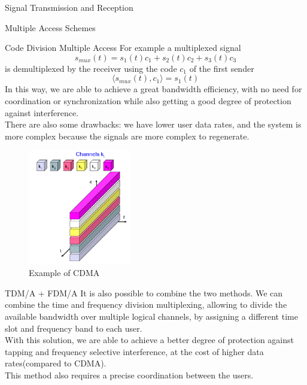\begin{section}{Signal Transmission and Reception}
\begin{subsection}{Multiple Access Schemes}
\begin{subsubsection}{Code Division Multiple Access}
      For example a multiplexed signal
      \begin{equation*}
        s_{mux}(t)=s_1(t)c_1+s_2(t)c_2+s_3(t)c_3
      \end{equation*}
      is demultiplexed by the receiver using the code $c_1$ of the first sender
      \begin{equation*}
        \langle s_{mux}(t),c_1\rangle=s_1(t)
      \end{equation*}
      In this way, we are able to achieve a great bandwidth efficiency, with no need for coordination
      or synchronization while also getting a good degree of protection against interference.\\
      There are also some drawbacks: we have lower user data rates, and the system is more complex
      because the signals are more complex to regenerate.\\
      \begin{figure}[h]
        \centering
        \includegraphics[width=0.4\textwidth]{img/wireless/CDMA.png}
        \caption{Example of CDMA}
        \label{fig:CDMA}
      \end{figure}
    \end{subsubsection}
    \begin{subsubsection}{TDM/A + FDM/A}
      It is also possible to combine the two methods.
      We can combine the time and frequency division multiplexing, allowing to divide the available
      bandwidth over multiple logical channels, by assigning a different time slot and frequency band
      to each user.\\
      With this solution, we are able to achieve a better degree of protection against tapping
      and frequency selective interference, at the cost of higher data rates(compared to CDMA).\\
      This method also requires a precise coordination between the users.\\
      \begin{figure}[h]

\end{figure}
\end{subsubsection}
\end{subsection}
\end{section}
